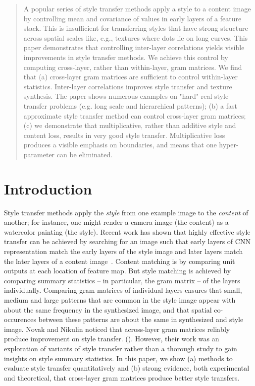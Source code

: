 \documentclass[runningheads]{llncs}
\begin{document}
\maketitle



\begin{abstract}
A popular series of style transfer methods apply a style to a content image by controlling mean and covariance of values in early layers of a feature stack. This is insufficient for transferring styles that have strong structure across spatial scales like, e.g., textures where dots lie on long curves. This paper demonstrates that controlling inter-layer correlations yields visible improvements in style transfer methods.  We achieve this control by computing cross-layer, rather than within-layer, gram matrices. We find that (a) cross-layer gram matrices are sufficient to control within-layer statistics. Inter-layer correlations improves style transfer and texture synthesis. The paper shows numerous examples on "hard" real style transfer problems (e.g. long scale and hierarchical patterns); (b) a fast approximate style transfer method can control cross-layer gram matrices; (c) we demonstrate that multiplicative, rather than additive style and content loss, results in very good style transfer. Multiplicative loss produces a visible emphasis on boundaries, and means that one hyper-parameter can be eliminated.   
\end{abstract}


\section{Introduction}

Style transfer methods apply the {\em style} from one example image to the {\em content} of another; for instance, one might render a camera image (the content) as a watercolor painting (the style). Recent work has shown that highly effective style transfer can be achieved by searching for an image such that early layers of CNN representation match the early layers of the style image and later layers match the later layers of a content image~\cite{gatys2016image}. Content matching is by comparing unit outputs at each location of feature map. But style matching is achieved by comparing summary statistics -- in particular, the gram matrix -- of the layers individually. Comparing gram matrices of individual layers ensures that small, medium and large patterns that are common in the style image appear with about the same frequency in the synthesized image, and that spatial co-occurences between these patterns are about the same in synthesized and style image.  Novak and Nikulin noticed that across-layer gram matrices reliably produce improvement on style transfer. (\cite{novak2016improving}). However, their work was an exploration of variants of style transfer rather than a thorough study to gain insights on style summary statistics.   In this paper, we show (a) methods to evaluate style transfer quantitatively and (b) strong evidence, both experimental and theoretical, that cross-layer gram matrices produce better style transfers.
\end{document}
